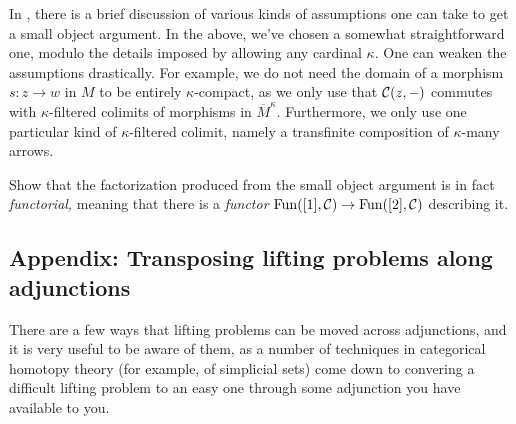 \begin{remark}
	In \cite[§12.2]{riehl-categorical-homotopy-theory}, there is a brief discussion of various kinds of assumptions one can take to get a small object argument. In the above, we've chosen
	a somewhat straightforward one, modulo the details imposed by allowing any cardinal \(\kappa\). One can weaken the assumptions drastically. For example, we do not need the domain
	of a morphism \(s\!:z\to w\) in \(M\) to be entirely \(\kappa\)-compact, as we only use that \(\mathcal{C}(z,-)\) commutes with \(\kappa\)-filtered colimits of morphisms in \(\overline{M}^\kappa\).
	Furthermore, we only use one particular kind of \(\kappa\)-filtered colimit, namely a transfinite composition of \(\kappa\)-many arrows.
\end{remark}
\begin{exercise}
	Show that the factorization produced from the small object argument is in fact \emph{functorial,} meaning that there is a \emph{functor} \(\operatorname{Fun}([1],\mathcal{C}) \to \operatorname{Fun}([2],\mathcal{C})\)
	describing it.
\end{exercise}


\subsection{Appendix: Transposing lifting problems along adjunctions}
There are a few ways that lifting problems can be moved across adjunctions, and it is very useful to be aware of them, as a number of techniques in categorical homotopy
theory (for example, of simplicial sets) come down to convering a difficult lifting problem to an easy one through some adjunction you have available to you.

